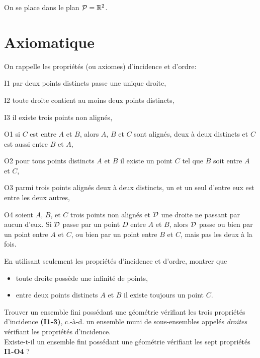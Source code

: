 \documentclass[a4paper,11pt,reqno]{amsart}
\begin{document}

\begin{convention}
  On se place dans le plan $\mathcal{P}=\mathbb{R}^2$.
\end{convention}


\section{Axiomatique}

On rappelle les propriétés (ou axiomes) d'incidence et d'ordre:

\begin{axioms}[leftmargin=3.5em]
  \item[I1] par deux points distincts passe une unique droite,
  \item[I2] toute droite contient au moins deux points distincts,
  \item[I3] il existe trois points non alignés,
  \item[O1] si $C$ est entre $A$ et $B$, alors $A$, $B$ et $C$ sont alignés, deux à deux distincts et $C$ est aussi entre $B$ et $A$,
  \item[O2] pour tous points distincts $A$ et $B$ il existe un point $C$ tel que $B$ soit entre $A$ et $C$,
  \item[O3] parmi trois points alignés deux à deux distincts, un et un seul d'entre eux est entre les deux autres,
  \item[O4] soient $A$, $B$, et $C$ trois points non alignés et $\mathcal{D}$ une droite ne passant par aucun d'eux. Si $\mathcal{D}$ passe par un point $D$ entre $A$ et $B$, alors $\mathcal{D}$ passe ou bien par un point entre $A$ et $C$, ou bien par un point entre $B$ et $C$, mais pas les deux à la fois.
\end{axioms}

\begin{exo}

  En utilisant seulement les propriétés d'incidence et d'ordre, montrer que
  \begin{itemize}
    \item toute droite possède une infinité de points,
    \item entre deux points distincts $A$ et $B$ il existe toujours un point $C$.
  \end{itemize}
\end{exo}

\begin{exo}

  Trouver un ensemble fini possédant une géométrie vérifiant les trois propriétés d'incidence \textbf{(I1-3)}, c.-à-d. un ensemble muni de sous-ensembles appelés \emph{droites} vérifiant les propriétés d'incidence.\\
  Existe-t-il un ensemble fini possédant une géométrie vérifiant les sept propriétés \textbf{I1-O4} ?
\end{exo}
\end{document}
